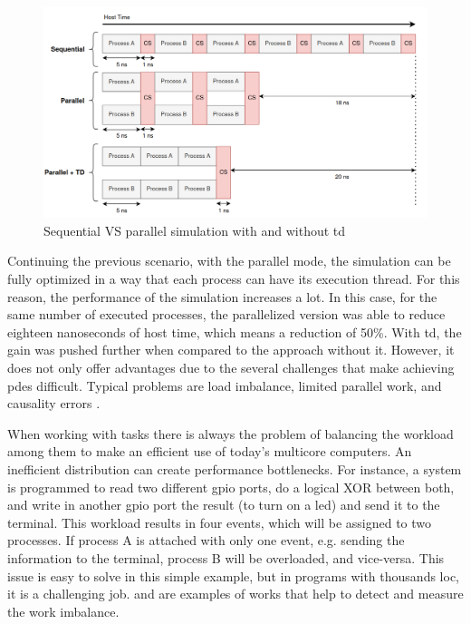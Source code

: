 \begin{figure}[H]
	\centering
 	\includegraphics[width=1\linewidth]{Images/ParallelSimulation.png}
 	\caption{Sequential VS parallel simulation with and without \gls{td}}
	 \label{fig_ParallelSimulation}
\end{figure}

Continuing the previous scenario, with the parallel mode, the simulation can be fully optimized in a way that each process can have its 
execution thread. For this reason, the performance of the simulation increases a lot. In this case, for the same number of executed processes, 
the parallelized version was able to reduce eighteen nanoseconds of host time, which means a reduction of 50\%. With \gls{td}, the gain was 
pushed further when compared to the approach without it. However, it does not only offer advantages due to the 
several challenges that make achieving \gls{pdes} difficult. Typical problems are load imbalance, limited parallel work, and causality 
errors \cite{yoga2019parallelism} \cite{zhou1992sequential}. 

When working with tasks there is always the problem of balancing the workload among them to make an efficient use of today's multicore 
computers. An inefficient distribution can create performance bottlenecks. For instance, a system is programmed to read two different 
\gls{gpio} ports, do a logical XOR between both, and write in another \gls{gpio} port the result (to turn on a \gls{led}) and send it to 
the terminal. This workload results in four events, which will be assigned to two processes. If process A is attached with only one event, 
e.g. sending the information to the terminal, process B will be overloaded, and vice-versa. This issue is easy to solve in this simple 
example, but in programs with thousands \gls{loc}, it is a challenging job. \cite{loadImbalance1} and \cite{loadImbalance2} are examples of 
works that help to detect and measure the work imbalance.

